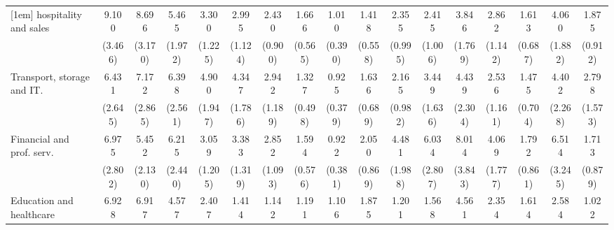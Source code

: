 {\begin{tabular}{l*{16}{c}}
[1em]
hospitality and sales&       9.100\sym{***}&       8.696\sym{***}&       5.465\sym{***}&       3.300\sym{**} &       2.995\sym{**} &       2.430\sym{*}  &       1.666         &       1.010         &       1.418         &       2.355\sym{*}  &       2.415\sym{*}  &       3.846\sym{**} &       2.862\sym{**} &       1.613         &       4.060\sym{**} &       1.875         \\
                    &     (3.466)         &     (3.170)         &     (1.972)         &     (1.225)         &     (1.124)         &     (0.900)         &     (0.565)         &     (0.390)         &     (0.558)         &     (0.995)         &     (1.006)         &     (1.769)         &     (1.142)         &     (0.687)         &     (1.882)         &     (0.912)         \\
[1em]
Transport, storage and IT.&       6.431\sym{***}&       7.172\sym{***}&       6.398\sym{***}&       4.900\sym{***}&       4.347\sym{***}&       2.942\sym{**} &       1.327         &       0.925         &       1.636         &       2.165         &       3.449\sym{**} &       4.439\sym{**} &       2.536\sym{*}  &       1.475         &       4.402\sym{**} &       2.798         \\
                    &     (2.645)         &     (2.865)         &     (2.561)         &     (1.947)         &     (1.786)         &     (1.189)         &     (0.498)         &     (0.379)         &     (0.689)         &     (0.982)         &     (1.636)         &     (2.304)         &     (1.161)         &     (0.704)         &     (2.268)         &     (1.573)         \\
[1em]
Financial and prof. serv.&       6.975\sym{***}&       5.452\sym{***}&       6.215\sym{***}&       3.059\sym{**} &       3.383\sym{**} &       2.852\sym{**} &       1.594         &       0.922         &       2.050         &       4.481\sym{***}&       6.034\sym{***}&       8.014\sym{***}&       4.069\sym{**} &       1.792         &       6.514\sym{***}&       1.713         \\
                    &     (2.802)         &     (2.130)         &     (2.440)         &     (1.205)         &     (1.319)         &     (1.093)         &     (0.576)         &     (0.381)         &     (0.869)         &     (1.988)         &     (2.807)         &     (3.843)         &     (1.777)         &     (0.861)         &     (3.245)         &     (0.879)         \\
[1em]
Education and healthcare&       6.928\sym{***}&       6.917\sym{***}&       4.577\sym{**} &       2.407         &       1.414         &       1.142         &       1.191         &       1.106         &       1.875         &       1.201         &       1.568         &       4.561\sym{*}  &       2.354         &       1.614         &       2.584         &       1.022         \\

\end{tabular}}
